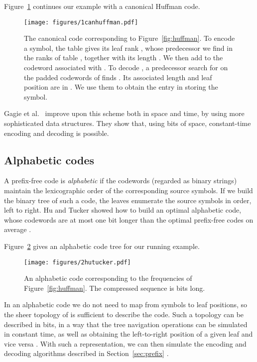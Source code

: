 \documentclass[preprint,12pt]{elsarticle}
\begin{document}
Figure~\ref{fig:canonical} continues our example with a canonical Huffman code.

\begin{figure}[t]
\begin{center}
\texttt{[image: figures/1canhuffman.pdf]}
\end{center}
\vspace*{-5mm}
\caption{The canonical code corresponding to Figure~\ref{fig:huffman}. To
encode a symbol, the table  gives its leaf rank , whose predecessor 
we find in the ranks of table , together with its length . We then add
 to the codeword associated with . To decode , a predecessor 
search for  on the padded codewords of  finds . Its associated 
length  and leaf position  are in . We use them 
to obtain the entry in  storing the symbol.}
\label{fig:canonical}
\end{figure}


Gagie et al.~\cite{GNNO15} improve upon this scheme both in space and time,
by using more sophisticated data structures. They show that, using 
 bits of space,
constant-time encoding and decoding is possible.

\subsection{Alphabetic codes}
\label{sec:defalpha}

A prefix-free code is {\em alphabetic} if the codewords (regarded as binary 
strings) maintain the lexicographic order of the corresponding source symbols. 
If we build the binary tree  of such a code, the leaves enumerate the source
symbols in order, left to right. Hu and Tucker \cite{HT71} showed how to build 
an optimal alphabetic code, whose codewords are at most one bit longer than the
optimal prefix-free codes on average \cite{CT06}.

Figure~\ref{fig:alpha} gives an alphabetic code tree for our running example.

\begin{figure}[t]
\begin{center}
\texttt{[image: figures/2hutucker.pdf]}
\end{center}
\vspace*{-5mm}
\caption{An alphabetic code corresponding to the frequencies of 
Figure~\ref{fig:huffman}. The compressed sequence is  bits long.}
\label{fig:alpha}
\end{figure}

In an alphabetic code we do not need to map from symbols to leaf positions,
so the sheer topology of  is sufficient to describe the code.
Such a topology can be described in  bits, in a way that the
tree navigation operations can be simulated in constant time, as well as 
obtaining the left-to-right position of a given leaf and vice versa \cite{MR01}.
With such a representation, we can then simulate the  encoding and
decoding algorithms described in Section~\ref{sec:prefix} \cite{GNNO15}.
\end{document}

